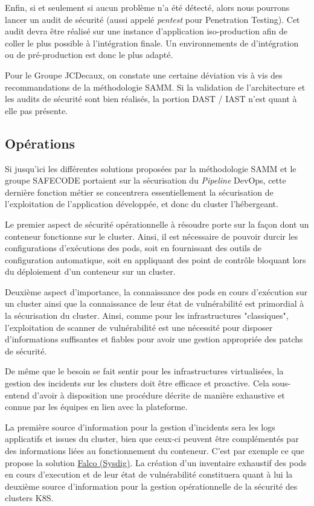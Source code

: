 Enfin, si et seulement si aucun problème n'a été détecté, alors nous pourrons lancer un audit de sécurité (aussi appelé 
\emph{pentest} pour Penetration Testing). Cet audit devra être réalisé sur une instance d'application iso-production afin
de coller le plus possible à l'intégration finale. Un environnements de d'intégration ou de pré-production est donc le 
plus adapté.

Pour le Groupe JCDecaux, on constate une certaine déviation vis à vis des recommandations de la méthodologie \ac{SAMM}.
Si la validation de l'architecture et les audits de sécurité sont bien réalisés, la portion \ac{DAST} / {IAST} n'est 
quant à elle pas présente.

\subsection{Opérations}
Si jusqu'ici les différentes solutions proposées par la méthodologie \ac{SAMM} et le groupe \ac{SAFECODE} portaient sur
la sécurisation du \emph{Pipeline} DevOps, cette dernière fonction métier se concentrera essentiellement la sécurisation
de l'exploitation de l'application développée, et donc du cluster l'hébergeant.

Le premier aspect de sécurité opérationnelle à résoudre porte sur la façon dont un conteneur fonctionne sur le cluster.
Ainsi, il est nécessaire de pouvoir durcir les configurations d'exécutions des pods, soit en fournissant des outils de 
configuration automatique, soit en  appliquant des point de contrôle bloquant lors du déploiement d'un conteneur sur un 
cluster.

Deuxième aspect d'importance, la connaissance des pods en cours d'exécution sur un cluster ainsi que la connaissance de
leur état de vulnérabilité est primordial à la sécurisation du cluster. Ainsi, comme pour les infrastructures "classiques",
l'exploitation de scanner de vulnérabilité est une nécessité pour disposer d'informations suffisantes et fiables pour
avoir une gestion appropriée des patchs de sécurité.

De même que le besoin se fait sentir pour les infrastructures virtualisées, la gestion des incidents sur les clusters doit 
être efficace et proactive. Cela sous-entend d'avoir à disposition une procédure décrite de manière exhaustive et connue
par les équipes en lien avec la plateforme.

La première source d'information pour la gestion d'incidents sera les logs applicatifs et issues du cluster, 
bien que ceux-ci peuvent être complémentés par des informations liées au fonctionnement du conteneur. C'est par exemple 
ce que propose la solution \href{https://sysdig.com/opensource/falco/}{Falco (Sysdig)}.
\newline La création d'un inventaire exhaustif des pods en cours d'execution et de leur état de vulnérabilité
constituera quant à lui la deuxième source d'information pour la gestion opérationnelle de la sécurité des clusters 
\ac{K8S}.

